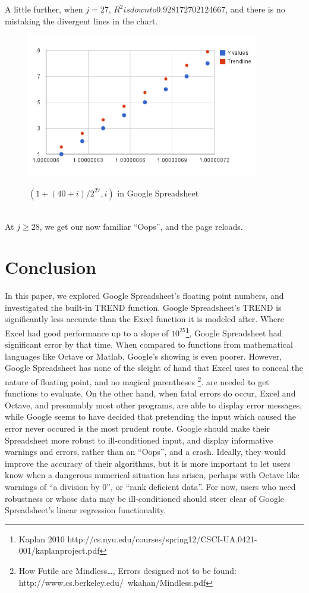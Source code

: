 \documentclass{article}
\begin{document}
A little further, when $j=27$, $R^2 is down to 0.928172702124667$, and there is no mistaking
the divergent lines in the chart.\\

\begin{figure}[h!]
  \caption{${(1 + (40 + i)/2^{27}, i)}$ in Google Spreadsheet}
  \centering
\includegraphics[width=4in]{TREND2j27.png}\\
\end{figure}\\

At $j\ge28$, we get our now familiar ``Oops'', and the page reloads.\\

\newpage
\section*{Conclusion}
In this paper, we explored Google Spreadsheet's floating point numbers, and investigated
the built-in TREND function.  Google Spreadsheet's TREND is significantly less accurate than
the Excel function it is modeled after.  Where Excel had good performance up to a slope of 
$10^25$\footnote{Kaplan 2010 http://cs.nyu.edu/courses/spring12/CSCI-UA.0421-001/kaplanproject.pdf},
Google Spreadsheet had significant error by that time.
When compared to functions from mathematical languages like Octave or Matlab, Google's showing
is even poorer.  However, Google Spreadsheet has none of the sleight of hand that Excel uses
to conceal the nature of floating point, and no magical parentheses
\footnote{How Futile are Mindless\dots, Errors designed not to be found: http://www.cs.berkeley.edu/~wkahan/Mindless.pdf}.
are needed to get functions to evaluate.
On the other hand, when fatal errors do occur, Excel and Octave, and presumably most other programs,
are able to display error messages, while Google seems to have decided that pretending the input
which caused the error never occured is the most prudent route.
Google should make their Spreadsheet more robust to ill-conditioned input, and display informative
warnings and errors, rather than an ``Oops'', and a crash.  Ideally, they would improve the accuracy
of their algorithms, but it is more important to let users know when a dangerous numerical situation
has arisen, perhaps with Octave like warnings of ``a division by 0'', or ``rank deficient data''.
For now, users who need robustness or whose data may be ill-conditioned should steer clear of 
Google Spreadsheet's linear regression functionality.
\end{document}
